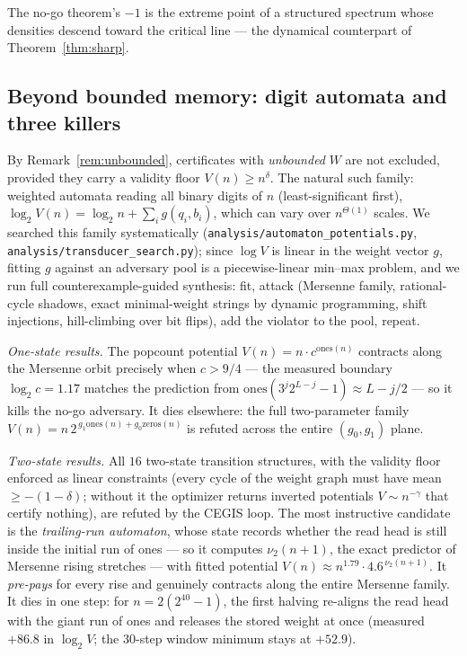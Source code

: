 \documentclass[11pt]{article}
\newcommand{\code}[1]{\texttt{#1}}
\begin{document}
\noindent
The no-go theorem's $-1$ is the extreme point of a structured
spectrum whose densities descend toward the critical line --- the
dynamical counterpart of Theorem~\ref{thm:sharp}.

\subsection{Beyond bounded memory: digit automata and three killers}
\label{sec:automata}

By Remark~\ref{rem:unbounded}, certificates with \emph{unbounded} $W$
are not excluded, provided they carry a validity floor
$V(n) \ge n^{\delta}$. The natural such family: weighted automata
reading all binary digits of $n$ (least-significant first), $\log_2
V(n) = \log_2 n + \sum_i g(q_i, b_i)$, which can vary over
$n^{\Theta(1)}$ scales. We searched this family systematically
(\code{analysis/automaton\_potentials.py},
\code{analysis/transducer\_search.py}); since $\log V$ is linear in
the weight vector $g$, fitting $g$ against an adversary pool is a
piecewise-linear min--max problem, and we run full
counterexample-guided synthesis: fit, attack (Mersenne family,
rational-cycle shadows, exact minimal-weight strings by dynamic
programming, shift injections, hill-climbing over bit flips), add the
violator to the pool, repeat.

\emph{One-state results.} The popcount potential
$V(n) = n \cdot c^{\mathrm{ones}(n)}$ contracts along the Mersenne
orbit precisely when $c > 9/4$ --- the measured boundary
$\log_2 c = 1.17$ matches the prediction from
$\mathrm{ones}(3^j 2^{L-j}-1) \approx L - j/2$ --- so it kills the
no-go adversary. It dies elsewhere: the full two-parameter family
$V(n) = n\, 2^{\,g_1 \mathrm{ones}(n) + g_0 \mathrm{zeros}(n)}$ is
refuted across the entire $(g_0, g_1)$ plane.

\emph{Two-state results.} All $16$ two-state transition structures,
with the validity floor enforced as linear constraints (every cycle of
the weight graph must have mean $\ge -(1-\delta)$; without it the
optimizer returns inverted potentials $V \sim n^{-\gamma}$ that
certify nothing), are refuted by the CEGIS loop. The most instructive
candidate is the \emph{trailing-run automaton}, whose state records
whether the read head is still inside the initial run of ones --- so
it computes $\nu_2(n+1)$, the exact predictor of Mersenne rising
stretches --- with fitted potential $V(n) \approx n^{1.79} \cdot
4.6^{\,\nu_2(n+1)}$. It \emph{pre-pays} for every rise and genuinely
contracts along the entire Mersenne family. It dies in one step: for
$n = 2(2^{40}-1)$, the first halving re-aligns the read head with the
giant run of ones and releases the stored weight at once (measured
$+86.8$ in $\log_2 V$; the $30$-step window minimum stays at
$+52.9$).
\end{document}
